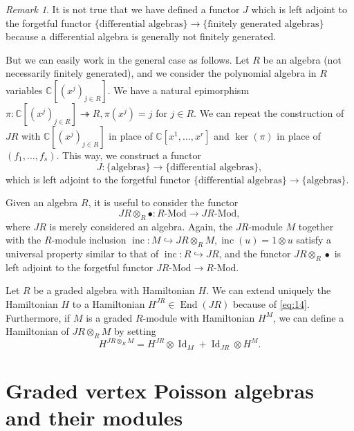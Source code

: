 \documentclass[a4paper, 12pt, reqno]{amsart}
\theoremstyle{remark}
\newtheorem{remark}[theorem]{Remark}
\DeclareMathOperator{\End}{End}
\DeclareMathOperator{\Id}{Id}
\DeclareMathOperator{\inc}{inc}
\begin{document}
\begin{remark}
  \label{rmk:8}
  It is not true that we have defined a functor $J$ which is left adjoint to the forgetful functor $\{\text{differential algebras}\} \to \{\text{finitely generated algebras}\}$ because a differential algebra is generally not finitely generated.

  But we can easily work in the general case as follows.
  Let $R$ be an algebra (not necessarily finitely generated), and we consider the polynomial algebra in $R$ variables $\mathbb{C}[(x^j)_{j \in R}]$.
  We have a natural epimorphism $\pi: \mathbb{C}[(x^j)_{j \in R}] \twoheadrightarrow R, \pi(x^j) = j$ for $j \in R$.
  We can repeat the construction of $JR$ with $\mathbb{C}[(x^j)_{j \in R}]$ in place of $\mathbb{C}[x^1, \dots, x^r]$ and $\ker(\pi)$ in place of $(f_1, \dots, f_s)$.
  This way, we construct a functor
  \begin{equation*}
    J: \{\text{algebras}\} \to \{\text{differential algebras}\},
  \end{equation*}
  which is left adjoint to the forgetful functor $\{\text{differential algebras}\} \to \{\text{algebras}\}$.
\end{remark}

Given an algebra $R$, it is useful to consider the functor
\begin{equation*}
  JR \otimes_R \bullet: \text{$R$-Mod} \to \text{$JR$-Mod},
\end{equation*}
where $JR$ is merely considered an algebra.
Again, the $JR$-module $M$ together with the $R$-module inclusion $\inc: M \hookrightarrow JR \otimes_R M, \inc(u) = 1\otimes u$ satisfy a universal property similar to that of $\inc: R \hookrightarrow JR$, and the functor $JR \otimes_R \bullet$ is left adjoint to the forgetful functor $\text{$JR$-Mod} \to \text{$R$-Mod}$.

Let $R$ be a graded algebra with Hamiltonian $H$.
We can extend uniquely the Hamiltonian $H$ to a Hamiltonian $H^{JR} \in \End(JR)$ because of \eqref{eq:14}.
Furthermore, if $M$ is a graded $R$-module with Hamiltonian $H^M$, we can define a Hamiltonian of $JR \otimes_R M$ by setting
\begin{equation*}
  H^{JR \otimes_R M} = H^{JR}\otimes\Id_{M} + \Id_{JR}\otimes H^M.
\end{equation*}

\section{Graded vertex Poisson algebras and their modules}
\label{sec:graded-vert-poiss}
\end{document}

